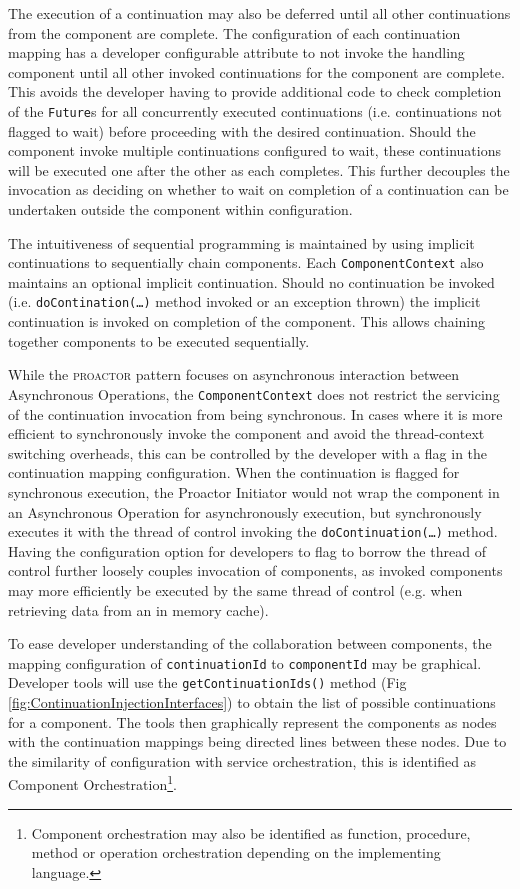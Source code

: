 \documentclass[prodmode]{style/acmlarge}
\begin{document}
The execution of a continuation may also be deferred until all other
continuations from the component are complete.  The configuration of each
continuation mapping has a developer configurable attribute to not invoke the
handling component until all other invoked continuations for the component are
complete.  This avoids the developer having to provide additional code to check
completion of the \texttt{Future}s for all concurrently executed continuations
(i.e. continuations not flagged to wait) before proceeding with the desired
continuation.  Should the component invoke multiple continuations configured to
wait, these continuations will be executed one after the other as each
completes.  This further decouples the invocation as deciding on whether to wait
on completion of a continuation can be undertaken outside the component within
configuration.

The intuitiveness of sequential programming is maintained by using implicit
continuations \cite{continuations} to sequentially chain components.  Each
\texttt{ComponentContext} also maintains an optional implicit continuation. 
Should no continuation be invoked (i.e. \texttt{doContination(\ldots)} method
invoked or an exception thrown) the implicit continuation is invoked on
completion of the component.  This allows chaining together components to be
executed sequentially.

While the \textsc{proactor} pattern focuses on asynchronous interaction between
Asynchronous Operations, the \texttt{ComponentContext} does not restrict the
servicing of the continuation invocation from being synchronous.  In cases where
it is more efficient to synchronously invoke the component and avoid the
thread-context switching overheads, this can be controlled by the developer with
a flag in the continuation mapping configuration.  When the continuation is
flagged for synchronous execution, the Proactor Initiator would not wrap the
component in an Asynchronous Operation for asynchronously execution, but
synchronously executes it with the thread of control invoking the
\texttt{doContinuation(\ldots)} method.  Having the configuration option for developers
to flag to borrow the thread of control further loosely couples invocation of
components, as invoked components may more efficiently be executed by the same
thread of control (e.g. when retrieving data from an in memory cache).

To ease developer understanding of the collaboration between components, the
mapping configuration of \texttt{continuationId}  to \texttt{componentId} may be
graphical.  Developer tools will use the \texttt{getContinuationIds()} method
(Fig \ref{fig:ContinuationInjectionInterfaces}) to obtain the list of possible
continuations for a component.  The tools then graphically represent the
components as nodes with the continuation mappings being directed lines between
these nodes.  Due to the similarity of configuration with service orchestration,
this is identified as Component Orchestration\footnote{Component orchestration
may also be identified as function, procedure, method or operation orchestration
depending on the implementing language.}.
\end{document}
